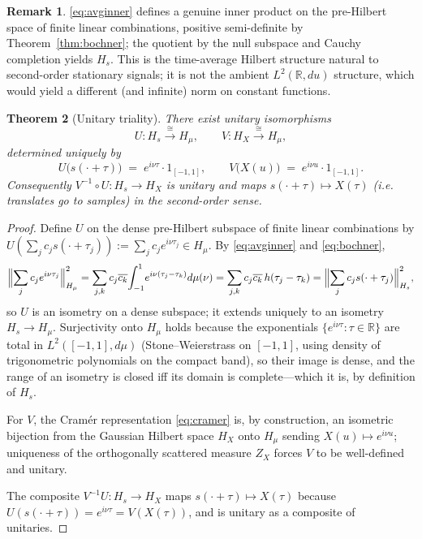 \documentclass[11pt]{article}
\newtheorem{theorem}{Theorem}
\theoremstyle{definition}
\newtheorem{remark}[theorem]{Remark}
\begin{document}
\begin{remark}
\eqref{eq:avginner} defines a genuine inner product on the pre-Hilbert
space of finite linear combinations, positive semi-definite by
Theorem~\ref{thm:bochner}; the quotient by the null subspace and Cauchy
completion yields $H_{s}$. This is the time-average Hilbert structure
natural to second-order stationary signals; it is not the ambient
$L^{2}(\mathbb{R},du)$ structure, which would yield a different (and
infinite) norm on constant functions.
\end{remark}

\begin{theorem}[Unitary triality]\label{thm:unitary}
There exist unitary isomorphisms
\begin{equation}\label{eq:triality}
U:H_{s}\xrightarrow{\;\cong\;}H_{\mu},\qquad
V:H_{X}\xrightarrow{\;\cong\;}H_{\mu},
\end{equation}
determined uniquely by
\[
U\bigl(s(\cdot+\tau)\bigr)\;=\;e^{i\nu\tau}\cdot 1_{[-1,1]},\qquad
V\bigl(X(u)\bigr)\;=\;e^{i\nu u}\cdot 1_{[-1,1]}.
\]
Consequently $V^{-1}\circ U:H_{s}\to H_{X}$ is unitary and maps
$s(\cdot+\tau)\mapsto X(\tau)$ (i.e. translates go to samples) in the
second-order sense.
\end{theorem}

\begin{proof}
Define $U$ on the dense pre-Hilbert subspace of finite linear
combinations by $U\!\left(\sum_{j}c_{j}s(\cdot+\tau_{j})\right) := \sum_{j}c_{j}e^{i\nu\tau_{j}}\in H_{\mu}$.
By \eqref{eq:avginner} and \eqref{eq:bochner},
\[
\Bigl\|\sum_{j}c_{j}e^{i\nu\tau_{j}}\Bigr\|_{H_{\mu}}^{2}
= \sum_{j,k}c_{j}\overline{c_{k}}\!\int_{-1}^{1}\!e^{i\nu(\tau_{j}-\tau_{k})}d\mu(\nu)
= \sum_{j,k}c_{j}\overline{c_{k}}\,h(\tau_{j}-\tau_{k})
= \Bigl\|\sum_{j}c_{j}s(\cdot+\tau_{j})\Bigr\|_{H_{s}}^{2},
\]
so $U$ is an isometry on a dense subspace; it extends uniquely to an
isometry $H_{s}\to H_{\mu}$. Surjectivity onto $H_{\mu}$ holds because
the exponentials $\{e^{i\nu\tau}:\tau\in\mathbb{R}\}$ are total in
$L^{2}([-1,1],d\mu)$ (Stone--Weierstrass on $[-1,1]$, using density of
trigonometric polynomials on the compact band), so their image is dense,
and the range of an isometry is closed iff its domain is complete---which
it is, by definition of $H_{s}$.

For $V$, the Cramér representation \eqref{eq:cramer} is, by construction,
an isometric bijection from the Gaussian Hilbert space $H_{X}$ onto
$H_{\mu}$ sending $X(u)\mapsto e^{i\nu u}$; uniqueness of the orthogonally
scattered measure $Z_{X}$ forces $V$ to be well-defined and unitary.

The composite $V^{-1}U:H_{s}\to H_{X}$ maps $s(\cdot+\tau)\mapsto X(\tau)$
because
$U(s(\cdot+\tau))=e^{i\nu\tau}=V(X(\tau))$, and is unitary as a composite
of unitaries.
\end{proof}
\end{document}
